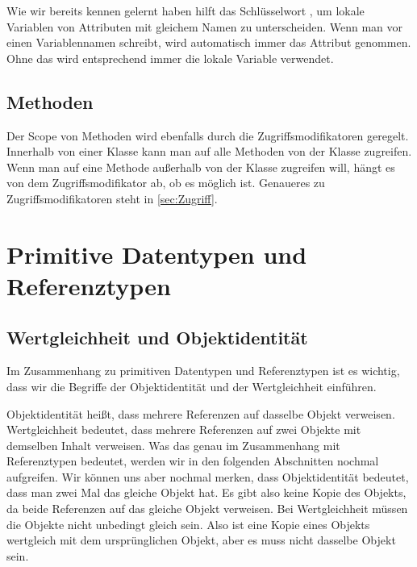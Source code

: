 \documentclass{tuda-pub}
\begin{document}
  \begin{note}[title=Information:]
    Wie wir bereits kennen gelernt haben hilft das Schlüsselwort , um lokale
    Variablen von Attributen mit gleichem Namen zu unterscheiden. Wenn man  vor
    einen Variablennamen schreibt, wird automatisch immer das Attribut genommen. Ohne das
     wird entsprechend immer die lokale Variable verwendet.
  \end{note}

  \subsection{Methoden}
  Der Scope von Methoden wird ebenfalls durch die Zugriffsmodifikatoren geregelt. Innerhalb von
  einer Klasse kann man auf alle Methoden von der Klasse zugreifen. Wenn man auf eine Methode
  außerhalb von der Klasse zugreifen will, hängt es von dem Zugriffsmodifikator ab, ob es möglich
  ist. Genaueres zu Zugriffsmodifikatoren steht in \ref{sec:Zugriff}.

  \clearpage


  \section{Primitive Datentypen und Referenztypen}
  \label{sec:Primitiv_Referenz_Typen}

  \subsection{Wertgleichheit und Objektidentität}
  Im Zusammenhang zu primitiven Datentypen und Referenztypen ist es wichtig, dass wir die
  Begriffe der Objektidentität und der Wertgleichheit einführen.

  \br

  Objektidentität heißt, dass mehrere Referenzen auf dasselbe Objekt verweisen. Wertgleichheit
  bedeutet, dass mehrere Referenzen auf zwei Objekte mit demselben Inhalt verweisen. Was das
  genau im Zusammenhang mit Referenztypen bedeutet, werden wir in den folgenden Abschnitten
  nochmal aufgreifen.
  \br
  Wir können uns aber nochmal merken, dass Objektidentität bedeutet, dass man zwei Mal das
  gleiche Objekt hat. Es gibt also keine Kopie des Objekts, da beide Referenzen auf das gleiche
  Objekt verweisen. Bei Wertgleichheit müssen die Objekte nicht unbedingt gleich sein. Also ist
  eine Kopie eines Objekts wertgleich mit dem ursprünglichen Objekt, aber es muss nicht dasselbe
  Objekt sein.
\end{document}
